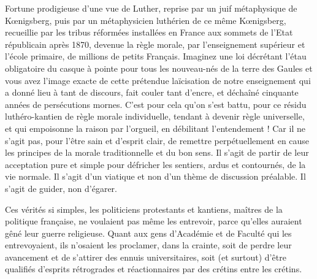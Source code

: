 \documentclass[french,twoside]{book} %
\begin{document}
Fortune prodigieuse d’une vue de Luther, reprise par un juif métaphysique de Kœnigsberg, puis par un métaphysicien luthérien de ce même Kœnigsberg, recueillie par les tribus réformées installées en France aux sommets de l’Etat républicain après 1870, devenue la règle morale, par l’enseignement supérieur et l’école primaire, de millions de petits Français. Imaginez une loi décrétant l’étau obligatoire du casque à pointe pour tous les nouveau-nés de la terre des Gaules et vous avez l’image exacte de cette prétendue laïcisation de notre enseignement qui a donné lieu à tant de discours, fait couler tant d’encre, et déchaîné cinquante années de persécutions mornes. C’est pour cela qu’on s’est battu, pour ce résidu luthéro-kantien de règle morale individuelle, tendant à devenir règle universelle, et qui empoisonne la raison par l’orgueil, en débilitant l’entendement ! Car il ne s’agit pas, pour l’être sain et d’esprit clair, de remettre perpétuellement en cause les principes de la morale traditionnelle et du bon sens. Il s’agit de partir de leur acceptation pure et simple pour défricher les sentiers, ardus et contournés, de la vie normale. Il s’agit d’un viatique et non d’un thème de discussion préalable. Il s’agit de guider, non d’égarer.\par
Ces vérités si simples, les politiciens protestants et kantiens, maîtres de la politique française, ne voulaient pas même les entrevoir, parce qu’elles auraient gêné leur guerre religieuse. Quant aux gens d’Académie et de Faculté qui les entrevoyaient, ils n’osaient les proclamer, dans la crainte, soit de perdre leur avancement et de s’attirer des ennuis universitaires, soit (et surtout) d’être qualifiés d’esprits rétrogrades et réactionnaires par des crétins entre les crétins.\par
\end{document}
